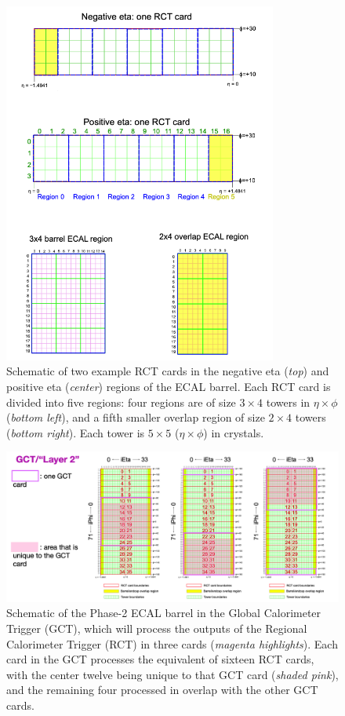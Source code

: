 \begin{figure}[ht]
    \centering
    \includegraphics[width=9cm]{figures/ch-4-phase2/phase-2-one-rct-card-schematic.png}
    \caption{Schematic of two example RCT cards in the negative eta (\textit{top}) and positive eta (\textit{center}) regions of the ECAL barrel. Each RCT card is divided into five regions: four regions are of size $3 \times 4$ towers in $\eta \times \phi$ (\textit{bottom left}), and a fifth smaller overlap region of size $2 \times 4$ towers (\textit{bottom right}). Each tower is $5 \times 5$ ($\eta\times\phi$) in crystals.}
    \label{fig:phase-2-one-rct-card-schematic}
\end{figure}


\begin{figure}[ht]
    \centering
    \includegraphics[width=15cm]{figures/ch-4-phase2/phase-2-gct-cards-schematic.png}
    \caption{Schematic of the Phase-2 ECAL barrel in the Global Calorimeter Trigger (GCT), which will process the outputs of the Regional Calorimeter Trigger (RCT) in three cards (\textit{magenta highlights}). Each card in the GCT processes the equivalent of sixteen RCT cards, with the center twelve being unique to that GCT card (\textit{shaded pink}), and the remaining four processed in overlap with the other GCT cards.}
    \label{fig:phase-2-gct-cards-schematic}
\end{figure}


